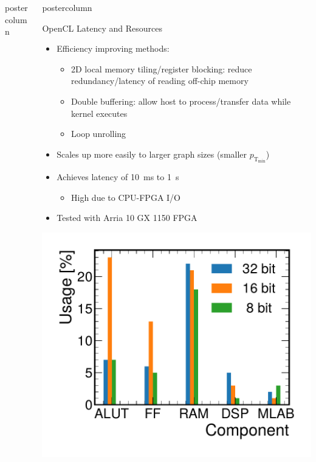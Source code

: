 \documentclass[final,hyperref={pdfpagelabels=false}]{beamer}
\newlength{\columnheight}
\newcommand{\ptmin}{\ensuremath{p_{\mathrm{T_{min}}}}\xspace}
\begin{document}
\begin{frame}
\begin{columns}
\begin{column}{.49\textwidth}
\begin{beamercolorbox}[center,wd=\textwidth]{postercolumn}
\begin{minipage}[T]{.95\textwidth}
{                }
              \end{minipage}
            \end{beamercolorbox}
          \end{column}

    \begin{column}{.49\textwidth}
      \begin{beamercolorbox}[center,wd=\textwidth]{postercolumn}
        \begin{minipage}[T]{.95\textwidth} 
          \parbox[t][\columnheight]{\textwidth}{
            
            \begin{block}{OpenCL Latency and Resources}
              \begin{itemize}
                \item Efficiency improving methods:
                \begin{itemize}
                    \item 2D local memory tiling/register blocking: reduce redundancy/latency of reading off-chip memory
                    \item Double buffering: allow host to process/transfer data while kernel executes
                    \item Loop unrolling
                \end{itemize}
                \vspace{6mm}
                \item Scales up more easily to larger graph sizes (smaller \ptmin)
                \item Achieves latency of 10~ms to 1~s
                \begin{itemize}
                    \item High due to CPU-FPGA I/O
                \end{itemize}
                \item Tested with Arria 10 GX 1150 FPGA
              \end{itemize}
              \begin{center}
                \includegraphics[width=0.33\linewidth]{resource_bit_precision_ocl.pdf}

\end{center}
\end{block}}
\end{minipage}
\end{beamercolorbox}
\end{column}
\end{columns}
\end{frame}
\end{document}
